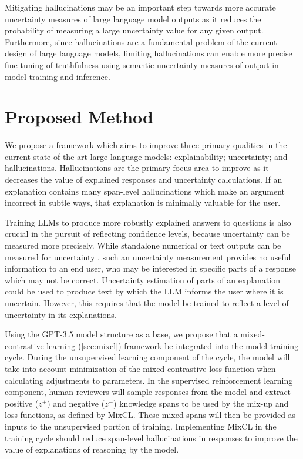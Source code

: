 \documentclass[letterpaper,12pt]{article}
\begin{document}
Mitigating hallucinations may be an important step towards more accurate uncertainty measures of large language model outputs as it reduces the probability of measuring a large uncertainty value for any given output. Furthermore, since hallucinations are a fundamental problem of the current design of large language models, limiting hallucinations can enable more precise fine-tuning of truthfulness using semantic uncertainty measures of output in model training and inference.

\section{Proposed Method}
\label{sec:proposed-method}

We propose a framework which aims to improve three primary qualities in the current state-of-the-art large language models: explainability; uncertainty; and hallucinations. Hallucinations are the primary focus area to improve as it decreases the value of explained responses and uncertainty calculations. If an explanation contains many span-level hallucinations which make an argument incorrect in subtle ways, that explanation is minimally valuable for the user.

Training LLMs to produce more robustly explained answers to questions is also crucial in the pursuit of reflecting confidence levels, because uncertainty can be measured more precisely. While standalone numerical or text outputs can be measured for uncertainty \cite{kuhn2023semantic}, such an uncertainty measurement provides no useful information to an end user, who may be interested in specific parts of a response which may not be correct. Uncertainty estimation of parts of an explanation could be used to produce text by which the LLM informs the user where it is uncertain. However, this requires that the model be trained to reflect a level of uncertainty in its explanations.

Using the GPT-3.5 model structure as a base, we propose that a mixed-contrastive learning (\cref{sec:mixcl}) framework be integrated into the model training cycle. During the unsupervised learning component of the cycle, the model will take into account minimization of the mixed-contrastive loss function when calculating adjustments to parameters. In the supervised reinforcement learning component, human reviewers will sample responses from the model and extract positive ($z^+$) and negative ($z^-$) knowledge spans to be used by the mix-up and loss functions, as defined by MixCL. These mixed spans will then be provided as inputs to the unsupervised portion of training. Implementing MixCL in the training cycle should reduce span-level hallucinations in responses to improve the value of explanations of reasoning by the model.
\end{document}
